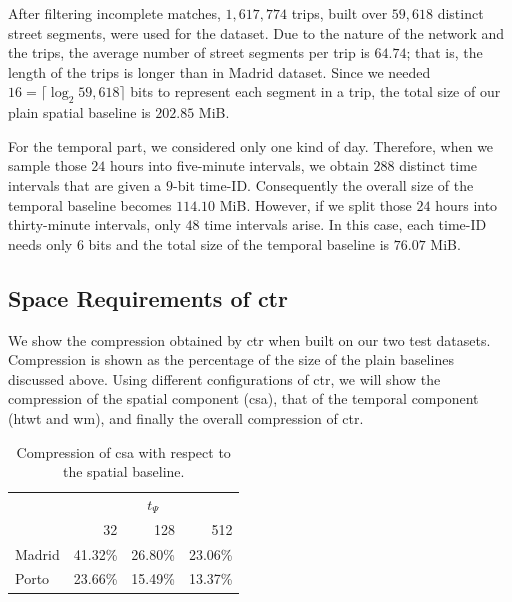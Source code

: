 \begin{itemize}
	  After filtering incomplete matches, $1,\!617,\!774$ trips, built  over $59,\!618$ distinct street segments, were used for the dataset. 
	  Due to the nature of the network and the trips, 
	  the average number of street segments per trip is $64.74$; that is, the length of the trips is longer than in Madrid dataset.
	  Since we needed $16=\lceil\log_2 59,\!618 \rceil$ bits to represent each segment in a trip, the total size of our
	  plain spatial baseline is $202.85$ MiB.

	  For the temporal part, we considered only one kind of day. Therefore, when we sample those $24$ hours into five-minute intervals,
	  we obtain $288$ distinct time intervals that are given a $9$-bit time-ID. Consequently the overall size of the temporal
	  baseline becomes $114.10$ MiB. However, if we split those $24$ hours into thirty-minute intervals, only $48$ time intervals 
	  arise. In this case, each time-ID needs only $6$ bits and the total size of the temporal baseline is $76.07$ MiB.
	\end{itemize}



	\subsection{Space Requirements of \acrshort{ctr}}\label{sec:exp.space}
	We show the compression obtained by \gls{ctr} when built on our two test datasets. Compression is shown
	as the percentage of the size of the plain baselines discussed above.
	Using different configurations of \gls{ctr}, we will show the compression of the spatial component (\gls{csa}), 
	that of the temporal component (\gls{htwt} and \gls{wm}), and finally the overall compression of \gls{ctr}.


	\begin{table}[htb]
	\begin{center}
	\scriptsize
	  \begin{tabular}{|l|*{3}{r}|}
	  \cline{2-4}
	  \multicolumn{1}{c|}{} & \multicolumn{3}{c|}{$t_{\Psi}$ } \\
	  \multicolumn{1}{c|}{} & 32 & 128 & 512 \\
	  \hline
	  Madrid & 41.32\% & 26.80\% & 23.06\% \\
	  Porto & 23.66\% & 15.49\% & 13.37\% \\
	  \hline
	  \end{tabular}
	\caption{Compression of \acrlong{csa} with respect to the spatial baseline.}
	\label{table:spatial_spaces}
	\vspace{-3mm}
	\end{center}
	\end{table}

